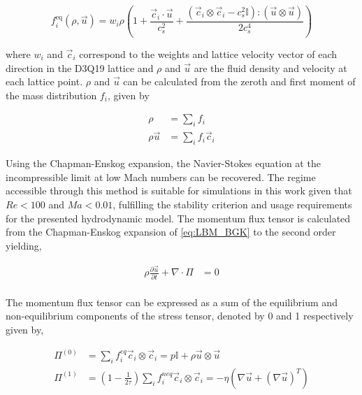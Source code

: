\begin{equation}
    f_i^{\text{eq}}(\rho, \vec{u}) = w_i \rho \left( 1 + \frac{\vec{c}_i \cdot \vec{u}}{c_s^2} + \frac{(\vec{c}_i \otimes \vec{c}_i - c_s^2 \mathbb{I}) : (\vec{u} \otimes \vec{u})}{2c_s^4} \right)
    \label{eq:LBM_Feq}
\end{equation}

where $w_i$ and $\vec{c}_i$ correspond to the weights and lattice velocity vector of each direction in the D3Q19 lattice and $\rho$ and $\vec{u}$ are the fluid density
and velocity at each lattice point. $\rho$ and $\vec{u}$ can be calculated from the zeroth and first moment of the mass distribution $f_i$, given by 

\begin{equation}
    \begin{split}
        \rho &= \sum_i f_i \\
        \rho\vec{u} &= \sum_i f_i \vec{c}_i
    \end{split}
\end{equation}

Using the Chapman-Enskog expansion, the Navier-Stokes equation at the incompressible limit at low Mach
numbers can be recovered. \cite{qian_lattice_1992, he_lattice_1997} The regime accessible through this method is suitable 
for simulations in this work given that $Re < 100$ and $Ma < 0.01$, fulfilling the stability 
criterion and usage requirements for the presented hydrodynamic model.
The momentum flux tensor is calculated from the Chapman-Enskog expansion of \ref{eq:LBM_BGK} to the second order yielding,

\begin{equation}
    \begin{split}
        \rho\frac{\partial \vec{u}}{\partial t} + \nabla \cdot \Pi &= 0 \\
    \end{split}
\end{equation}

The momentum flux tensor can be expressed as a sum of the equilibrium and non-equilibrium components of the stress tensor, denoted by 0 and 1 respectively given by,

\begin{equation}
    \begin{split}
        \Pi^{(0)} &= \sum_i f_i^{eq} \vec{c}_i \otimes \vec{c}_i = p\mathbb{I} + \rho \vec{u} \otimes \vec{u} \\
        \Pi^{(1)} &= (1 - \frac{1}{2 \tau})\sum_i f_i^{neq} \vec{c}_i \otimes \vec{c}_i = -\eta (\nabla \vec{u} + (\nabla \vec{u})^T)
    \end{split}
\end{equation}


